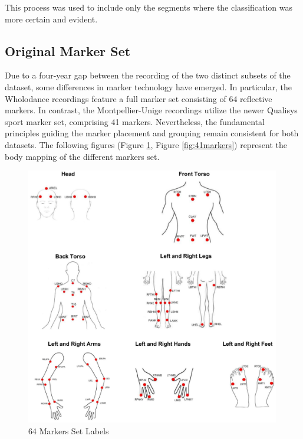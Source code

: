 This process was used to include only the segments where the classification was more certain and evident.


\subsection{Original Marker Set}
Due to a four-year gap between the recording of the two distinct subsets of the dataset, 
some differences in marker technology have emerged. 
In particular, the Wholodance recordings feature a full marker set consisting of 64 reflective markers. 
In contrast, the Montpellier-Unige recordings utilize the newer Qualisys sport marker set, comprising 41 markers. 
Nevertheless, the fundamental principles guiding the marker placement and grouping remain consistent for both datasets. 
The following figures (Figure \ref{fig:64markers}, Figure \ref{fig:41markers}) represent the body mapping of the different markers set. 

\begin{figure}[H]
    \centering
    \includegraphics[width=0.99\textwidth]{graphics/full_marker_set.png}
    \caption{64 Markers Set Labels}
    \label{fig:64markers}
\end{figure}

